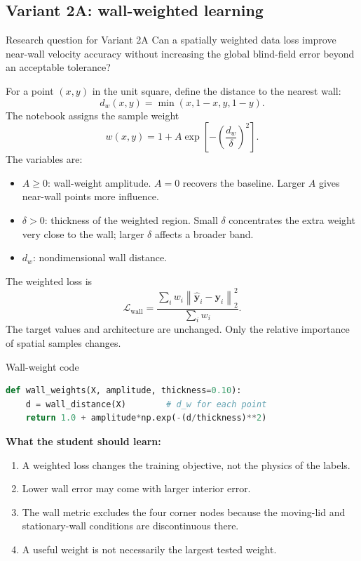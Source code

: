 \documentclass[11pt]{article}
\begin{document}
\subsection{Variant 2A: wall-weighted learning}
\begin{projectbox}{Research question for Variant 2A}
Can a spatially weighted data loss improve near-wall velocity accuracy without increasing the global blind-field error beyond an acceptable tolerance?
\end{projectbox}

For a point $(x,y)$ in the unit square, define the distance to the nearest wall:
\[
d_w(x,y)=\min(x,1-x,y,1-y).
\]
The notebook assigns the sample weight
\[
w(x,y)=1+A\exp\left[-\left(\frac{d_w}{\delta}\right)^2\right].
\]
The variables are:
\begin{itemize}
\item $A\ge0$: wall-weight amplitude. $A=0$ recovers the baseline. Larger $A$ gives near-wall points more influence.
\item $\delta>0$: thickness of the weighted region. Small $\delta$ concentrates the extra weight very close to the wall; larger $\delta$ affects a broader band.
\item $d_w$: nondimensional wall distance.
\end{itemize}

The weighted loss is
\[
\mathcal L_{\mathrm{wall}}
=\frac{\sum_i w_i\left\|\widehat{\mathbf y}_i-\mathbf y_i\right\|_2^2}
{\sum_i w_i}.
\]
The target values and architecture are unchanged. Only the relative importance of spatial samples changes.

\begin{codeguide}{Wall-weight code}
\begin{lstlisting}[language=Python]
def wall_weights(X, amplitude, thickness=0.10):
    d = wall_distance(X)        # d_w for each point
    return 1.0 + amplitude*np.exp(-(d/thickness)**2)
\end{lstlisting}
\end{codeguide}

\textbf{What the student should learn:}
\begin{enumerate}
\item A weighted loss changes the training objective, not the physics of the labels.
\item Lower wall error may come with larger interior error.
\item The wall metric excludes the four corner nodes because the moving-lid and stationary-wall conditions are discontinuous there.
\item A useful weight is not necessarily the largest tested weight.
\end{enumerate}
\end{document}
